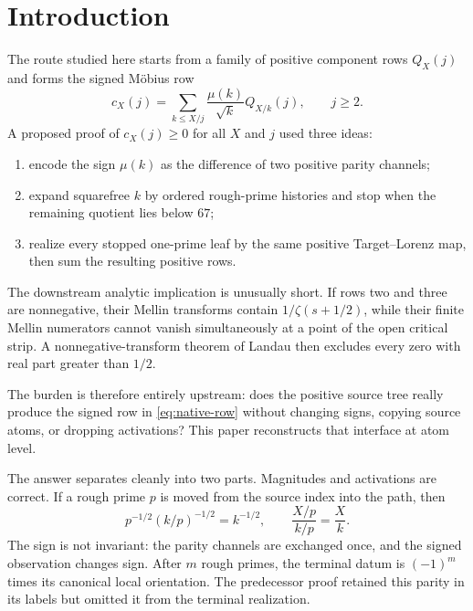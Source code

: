 \documentclass[11pt]{article}
\newcommand{\1}{\mathbf 1}
\begin{document}
\begin{center}
\end{center}

\tableofcontents

\section{Introduction}

The route studied here starts from a family of positive component rows
$Q_X(j)$ and forms the signed M\"obius row
\begin{equation}
 c_X(j)=\sum_{k\le X/j}\frac{\mu(k)}{\sqrt{k}}Q_{X/k}(j),
 \qquad j\ge2.
 \label{eq:native-row}
\end{equation}
A proposed proof of $c_X(j)\ge0$ for all $X$ and $j$ used three ideas:

\begin{enumerate}[label=(\roman*)]
\item encode the sign $\mu(k)$ as the difference of two positive parity channels;
\item expand squarefree $k$ by ordered rough-prime histories and stop when the
remaining quotient lies below $67$;
\item realize every stopped one-prime leaf by the same positive Target--Lorenz
map, then sum the resulting positive rows.
\end{enumerate}

The downstream analytic implication is unusually short.  If rows two and three
are nonnegative, their Mellin transforms contain $1/\zeta(s+1/2)$, while their
finite Mellin numerators cannot vanish simultaneously at a point of the open
critical strip.  A nonnegative-transform theorem of Landau then excludes every
zero with real part greater than $1/2$.

The burden is therefore entirely upstream: does the positive source tree really
produce the signed row in \eqref{eq:native-row} without changing signs, copying
source atoms, or dropping activations?  This paper reconstructs that interface
at atom level.

The answer separates cleanly into two parts.  Magnitudes and activations are
correct.  If a rough prime $p$ is moved from the source index into the path,
then
\[
 p^{-1/2}(k/p)^{-1/2}=k^{-1/2},
 \qquad
 \frac{X/p}{k/p}=\frac{X}{k}.
\]
The sign is not invariant: the parity channels are exchanged once, and the
signed observation changes sign.  After $m$ rough primes, the terminal datum is
$(-1)^m$ times its canonical local orientation.  The predecessor proof retained
this parity in its labels but omitted it from the terminal realization.
\end{document}
